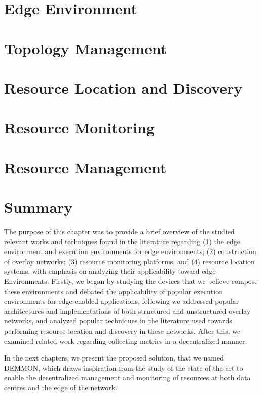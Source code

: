 \section{Edge Environment} \label{sec:edge_computing} 


\section{Topology Management} \label{sec:topology_management} 

\section{Resource Location and Discovery} \label{sec:res_location} 

\section{Resource Monitoring} \label{sec:res_monitoring} 

\section{Resource Management} \label{sec:res_management} 

\section{Summary}

The purpose of this chapter was to provide a brief overview of the studied relevant works and techniques found in the literature regarding (1) the edge environment and execution environments for edge environments; (2) construction of overlay networks; (3) resource monitoring platforms, and (4) resource location systems, with emphasis on analyzing their applicability toward edge Environments. Firstly, we began by studying the devices that we believe compose these environments and debated the applicability of popular execution environments for edge-enabled applications, following we addressed popular architectures and implementations of both structured and unstructured overlay networks, and analyzed popular techniques in the literature used towards performing resource location and discovery in these networks. After this, we examined related work regarding collecting metrics in a decentralized manner.

In the next chapters, we present the proposed solution, that we named DEMMON, which draws inspiration from the study of the state-of-the-art to enable the decentralized management and monitoring of resources at both data centres and the edge of the network.